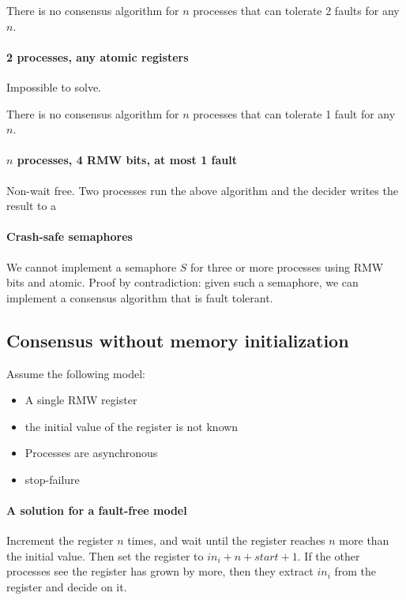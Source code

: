 \documentclass{idc_msc}
\begin{document}
There is no consensus algorithm for $n$ processes that can tolerate 2 faults for any $n$.

\paragraph{2 processes, any atomic registers}

Impossible to solve.

There is no consensus algorithm for $n$ processes that can tolerate 1 fault for any $n$.

\paragraph{$n$ processes, 4 RMW bits, at most 1 fault}

Non-wait free. Two processes run the above algorithm and the decider writes the result to a %


\paragraph{Crash-safe semaphores}

We cannot implement a semaphore $S$ for three or more processes using RMW bits and atomic.
Proof by contradiction: given such a semaphore, we can implement a consensus algorithm that is fault tolerant.

\subsection{Consensus without memory initialization}

Assume the following model:

\begin{itemize}
  \item A single RMW register
  \item the initial value of the register is not known
  \item Processes are asynchronous
  \item stop-failure
\end{itemize}

\paragraph{A solution for a fault-free model}
Increment the register $n$ times, and wait until the register reaches $n$ more than the initial value. Then set the register to $in_i + n + start + 1$. If the other processes see the register has grown by more, then they extract $in_i$ from the register and decide on it.
\end{document}
